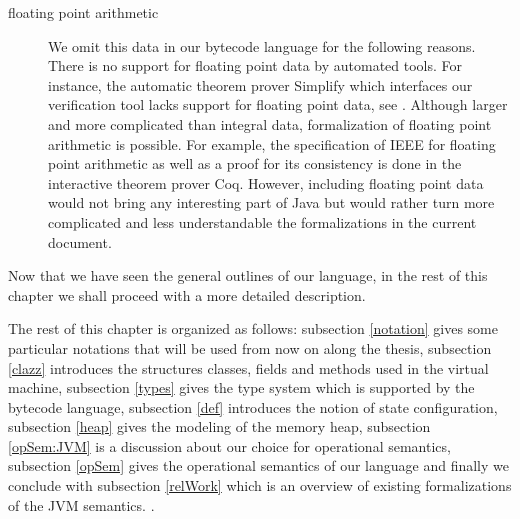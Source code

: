 \begin{description}
   \item [floating point arithmetic] We omit this data in our bytecode language for the following reasons.
	 There is no support for floating point data by automated tools.  
	 For instance, the automatic theorem prover Simplify which interfaces our verification tool
	 lacks support for floating point data, see  \cite{ESC2000LNS}. 
	 Although larger and more complicated than integral data, formalization of floating point arithmetic is possible. 
	 For example, the specification of IEEE  \cite{DRT03GLF} for floating point
	 arithmetic as well as a proof for its consistency  is done in the interactive
	 theorem prover Coq. 
	 However, including floating point data would not
	 bring any interesting part of Java but would rather turn more complicated
	 and less understandable the formalizations in the current document.
	  
         
 \end{description}

 Now that we have seen the general outlines of our language,
 in the rest of this chapter we shall proceed with a more detailed description.



  
 The rest of this chapter is organized as follows:
 subsection \ref{notation} gives some particular notations that will be used from now on along the thesis,
 subsection \ref{clazz} introduces the structures classes, fields and methods  used in the virtual machine, 
 subsection \ref{types} gives the type system which is supported by the bytecode language,
 subsection \ref{def} introduces the notion of state configuration,
 subsection \ref{heap} gives the modeling of the memory heap,
 subsection \ref{opSem:JVM} is a discussion about our choice for operational semantics,
 subsection \ref{opSem} gives the operational semantics of our language 
 and finally we conclude with subsection \ref{relWork}  which is an overview of existing formalizations of the JVM semantics.
.

